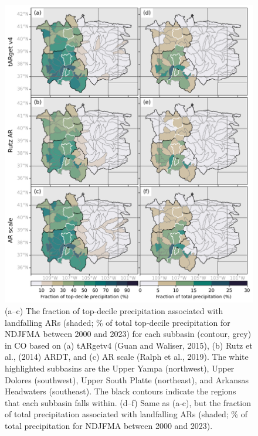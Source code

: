 \documentclass[draft]{agujournal2019}
\begin{document}
\begin{figure}
\noindent\includegraphics[width=\textwidth, height=\textheight, keepaspectratio]{fig6.png}
\caption{(a–c) The fraction of top-decile precipitation associated with landfalling ARs (shaded; \% of total top-decile precipitation for NDJFMA between 2000 and 2023) for each subbasin (contour, grey) in CO based on (a) tARgetv4 (Guan and Waliser, 2015), (b) Rutz et al., (2014) ARDT, and (c) AR scale (Ralph et al., 2019). The white highlighted subbasins are the Upper Yampa (northwest), Upper Dolores (southwest), Upper South Platte (northeast), and Arkansas Headwaters (southeast). The black contours indicate the regions that each subbasin falls within. (d–f) Same as (a-c), but the fraction of total precipitation associated with landfalling ARs (shaded; \% of total precipitation for NDJFMA between 2000 and 2023).}
\label{fig:choropleth}
\end{figure}
\end{document}
